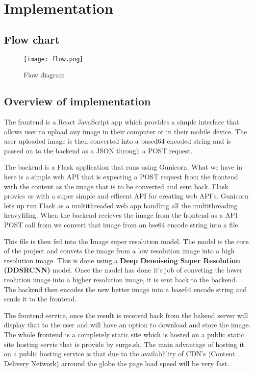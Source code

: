 \chapter{Implementation}

\section{Flow chart}

\begin{figure}[htb]
    \centering
    \texttt{[image: flow.png]}
    \caption{Flow diagram}
    \label{fig:flow}
\end{figure}

\section {Overview of implementation}

The frontend is a React JavaScript app which provides a simple interface that allows user to upload any image in their computer or in their mobile device. The user uploaded image is then converted into a based64 encoded string and is passed on to the backend as a JSON through a POST request.

The backend is a Flask application that runs using Gunicorn. What we have in here is a simple web API that is expecting a POST request from the frontend with the content as the image that is to be converted and sent back. Flask provies us with a super simple and efficent API for creating web API's. Gunicorn lets up run Flask as a multithreaded web app handling all the multithreading heavylifing. When the backend recieves the image from the frontend as a API POST call from we convert that image from an bse64 encode string into a file.

This file is then fed into the Image super resolution model. The model is the core of the project and convets the image from a low resolution image into a high resolution image. This is done using a \textbf{Deep Denoiseing Super Resolution (DDSRCNN)} model. Once the model has done it's job of conveting the lower reolution image into a higher resolution image, it is sent back to the backend. The backend then encodes the new better image into a base64 encode string and sends it to the frontend.

The frontend service, once the result is received back from the bakend server will display that to the user and will have an option to download and store the image. The whole frontend is a completely static site which is hosted on a public static site hosting servie that is provide by surge.sh. The main advantage of hosting it on a public hosting service is that due to the availablility of CDN's (Content Delivery Network) arround the globe the page load speed will be very fast.

